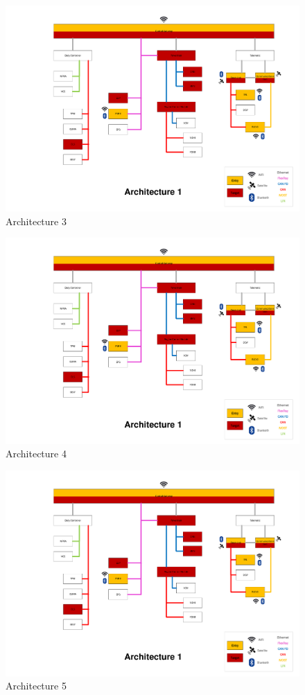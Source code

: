\begin{figure}
    \caption{Architecture 3}
    \includegraphics[width=\textwidth, page=3]{../Architectures-survey.pdf}
\end{figure}

\begin{figure}
    \caption{Architecture 4}
    \includegraphics[width=\textwidth, page=4]{../Architectures-survey.pdf}
\end{figure}

\begin{figure}
    \caption{Architecture 5}
    \includegraphics[width=\textwidth, page=5]{../Architectures-survey.pdf}
\end{figure}

